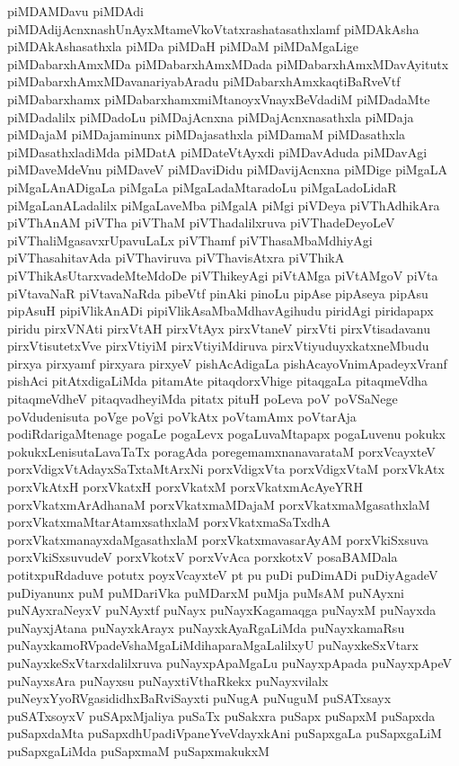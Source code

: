 {piMDAMDavu
piMDAdi
piMDAdijAcnxnashUnAyxMtameVkoVtatxrashatasathxlamf
piMDAkAsha
piMDAkAshasathxla
piMDa
piMDaH
piMDaM
piMDaMgaLige
piMDabarxhAmxMDa
piMDabarxhAmxMDada
piMDabarxhAmxMDavAyitutx
piMDabarxhAmxMDavanariyabAradu
piMDabarxhAmxkaqtiBaRveVtf
piMDabarxhamx
piMDabarxhamxmiMtanoyxVnayxBeVdadiM
piMDadaMte
piMDadalilx
piMDadoLu
piMDajAcnxna
piMDajAcnxnasathxla
piMDaja
piMDajaM
piMDajaminunx
piMDajasathxla
piMDamaM
piMDasathxla
piMDasathxladiMda
piMDatA
piMDateVtAyxdi
piMDavAduda
piMDavAgi
piMDaveMdeVnu
piMDaveV
piMDaviDidu
piMDavijAcnxna
piMDige
piMgaLA
piMgaLAnADigaLa
piMgaLa
piMgaLadaMtaradoLu
piMgaLadoLidaR
piMgaLanALadalilx
piMgaLaveMba
piMgalA
piMgi
piVDeya
piVThAdhikAra
piVThAnAM
piVTha
piVThaM
piVThadalilxruva
piVThadeDeyoLeV
piVThaliMgasavxrUpavuLaLx
piVThamf
piVThasaMbaMdhiyAgi
piVThasahitavAda
piVThaviruva
piVThavisAtxra
piVThikA
piVThikAsUtarxvadeMteMdoDe
piVThikeyAgi
piVtAMga
piVtAMgoV
piVta
piVtavaNaR
piVtavaNaRda
pibeVtf
pinAki
pinoLu
pipAse
pipAseya
pipAsu
pipAsuH
pipiVlikAnADi
pipiVlikAsaMbaMdhavAgihudu
piridAgi
piridapapx
piridu
pirxVNAti
pirxVtAH
pirxVtAyx
pirxVtaneV
pirxVti
pirxVtisadavanu
pirxVtisutetxVve
pirxVtiyiM
pirxVtiyiMdiruva
pirxVtiyuduyxkatxneMbudu
pirxya
pirxyamf
pirxyara
pirxyeV
pishAcAdigaLa
pishAcayoVnimApadeyxVranf
pishAci
pitAtxdigaLiMda
pitamAte
pitaqdorxVhige
pitaqgaLa
pitaqmeVdha
pitaqmeVdheV
pitaqvadheyiMda
pitatx
pituH
poLeva
poV
poVSaNege
poVdudenisuta
poVge
poVgi
poVkAtx
poVtamAmx
poVtarAja
podiRdarigaMtenage
pogaLe
pogaLevx
pogaLuvaMtapapx
pogaLuvenu
pokukx
pokukxLenisutaLavaTaTx
poragAda
poregemamxnanavarataM
porxVcayxteV
porxVdigxVtAdayxSaTxtaMtArxNi
porxVdigxVta
porxVdigxVtaM
porxVkAtx
porxVkAtxH
porxVkatxH
porxVkatxM
porxVkatxmAcAyeYRH
porxVkatxmArAdhanaM
porxVkatxmaMDajaM
porxVkatxmaMgasathxlaM
porxVkatxmaMtarAtamxsathxlaM
porxVkatxmaSaTxdhA
porxVkatxmanayxdaMgasathxlaM
porxVkatxmavasarAyAM
porxVkiSxsuva
porxVkiSxsuvudeV
porxVkotxV
porxVvAca
porxkotxV
posaBAMDala
potitxpuRdaduve
potutx
poyxVcayxteV
pt
pu
puDi
puDimADi
puDiyAgadeV
puDiyanunx
puM
puMDariVka
puMDarxM
puMja
puMsAM
puNAyxni
puNAyxraNeyxV
puNAyxtf
puNayx
puNayxKagamaqga
puNayxM
puNayxda
puNayxjAtana
puNayxkArayx
puNayxkAyaRgaLiMda
puNayxkamaRsu
puNayxkamoRVpadeVshaMgaLiMdihaparaMgaLalilxyU
puNayxkeSxVtarx
puNayxkeSxVtarxdalilxruva
puNayxpApaMgaLu
puNayxpApada
puNayxpApeV
puNayxsAra
puNayxsu
puNayxtiVthaRkekx
puNayxvilalx
puNeyxYyoRVgasididhxBaRviSayxti
puNugA
puNuguM
puSATxsayx
puSATxsoyxV
puSApxMjaliya
puSaTx
puSakxra
puSapx
puSapxM
puSapxda
puSapxdaMta
puSapxdhUpadiVpaneYveVdayxkAni
puSapxgaLa
puSapxgaLiM
puSapxgaLiMda
puSapxmaM
puSapxmakukxM
}
